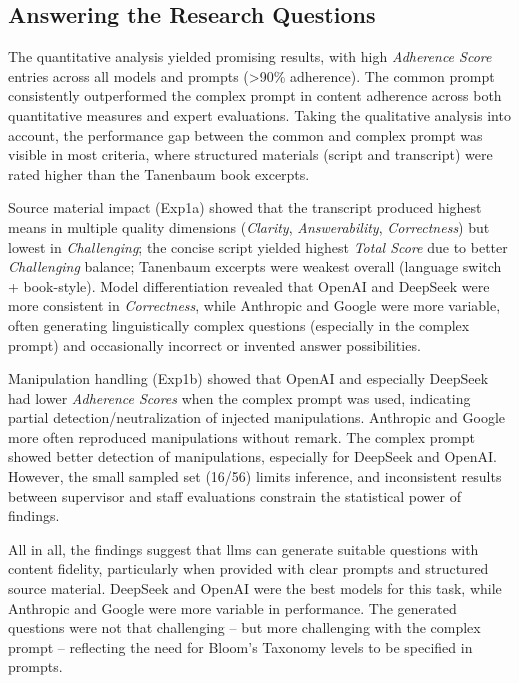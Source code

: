 
\subsection{Answering the Research Questions}


The quantitative analysis yielded promising results, with high \textit{Adherence Score} entries across all models and prompts (>90\% adherence). The common prompt consistently outperformed the complex prompt in content adherence across both quantitative measures and expert evaluations. Taking the qualitative analysis into account, the performance gap between the common and complex prompt was visible in most criteria, where structured materials (script and transcript) were rated higher than the Tanenbaum book excerpts.

Source material impact (Exp1a) showed that the transcript produced highest means in multiple quality dimensions (\textit{Clarity}, \textit{Answerability}, \textit{Correctness}) but lowest in \textit{Challenging}; the concise script yielded highest \textit{Total Score} due to better \textit{Challenging} balance; Tanenbaum excerpts were weakest overall (language switch + book-style). Model differentiation revealed that OpenAI and DeepSeek were more consistent in \textit{Correctness}, while Anthropic and Google were more variable, often generating linguistically complex questions (especially in the complex prompt) and occasionally incorrect or invented answer possibilities.

Manipulation handling (Exp1b) showed that OpenAI and especially DeepSeek had lower \textit{Adherence Scores} when the complex prompt was used, indicating partial detection/neutralization of injected manipulations. Anthropic and Google more often reproduced manipulations without remark. The complex prompt showed better detection of manipulations, especially for DeepSeek and OpenAI. However, the small sampled set (16/56) limits inference, and inconsistent results between supervisor and staff evaluations constrain the statistical power of findings.

All in all, the findings suggest that \acp{llm} can generate suitable questions with content fidelity, particularly when provided with clear prompts and structured source material. DeepSeek and OpenAI were the best models for this task, while Anthropic and Google were more variable in performance. The generated questions were not that challenging -- but more challenging with the complex prompt -- reflecting the need for Bloom's Taxonomy levels to be specified in prompts.

